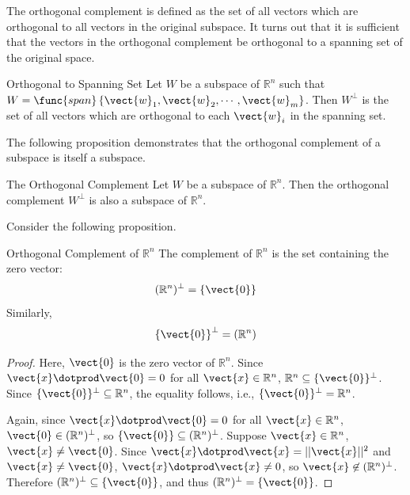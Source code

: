 The orthogonal complement is defined as the set of all vectors which are orthogonal to all vectors in the original subspace. It turns out that it is sufficient that the vectors in the orthogonal complement be orthogonal to a spanning set of the original space.

\begin{proposition}{Orthogonal to Spanning Set}\label{prop:orthogonalspanningset}
Let $W$ be a subspace of $\mathbb{R}^n$ such that $W = \func{span} \left\{ \vect{w}_1, \vect{w}_2, \cdots, \vect{w}_m \right\}$. Then $W^{\perp}$ is the set of all vectors which are orthogonal to each $\vect{w}_i$ in the spanning set. 
\end{proposition}

The following proposition demonstrates that the orthogonal complement of a subspace is itself a subspace. 

\begin{proposition}{The Orthogonal Complement}\label{prop:subspacecomplement}
Let $W$ be a subspace of $\mathbb{R}^n$. Then the orthogonal complement $W^{\perp}$ is also a subspace of $\mathbb{R}^n$.
\end{proposition}

Consider the following proposition.

\begin{proposition}{Orthogonal Complement of $\mathbb{R}^n$}\label{prop:complementofrn}
The complement of $\mathbb{R}^n$ is the set containing the zero vector:
\[
 (\mathbb{R}^n)^{\perp} = \left\{ \vect{0} \right\}
\]
Similarly, 
\[
\left\{ \vect{0} \right\}^{\perp} = (\mathbb{R}^n)
\]
\end{proposition}

\begin{proof}
Here, $\vect{0}$ is the zero vector of $\mathbb{R}^n$.
Since $\vect{x}\dotprod\vect{0}=0$ for all $\vect{x}\in\mathbb{R}^n$, 
$\mathbb{R}^n\subseteq\{ \vect{0}\}^{\perp}$.
Since $\{ \vect{0}\}^{\perp}\subseteq\mathbb{R}^n$, the equality follows,
i.e., $\{ \vect{0}\}^{\perp}=\mathbb{R}^n$.

Again, since $\vect{x}\dotprod\vect{0}=0$ for all $\vect{x}\in\mathbb{R}^n$,
$\vect{0}\in (\mathbb{R}^n)^{\perp}$, so $\{ \vect{0}\}\subseteq(\mathbb{R}^n)^{\perp}$.
Suppose $\vect{x}\in\mathbb{R}^n$, $\vect{x}\neq\vect{0}$.  
Since $\vect{x}\dotprod\vect{x}=||\vect{x}||^2$ and $\vect{x}\neq\vect{0}$,
$\vect{x}\dotprod\vect{x}\neq 0$, so $\vect{x}\not\in(\mathbb{R}^n)^{\perp}$.
Therefore $(\mathbb{R}^n)^{\perp}\subseteq \{\vect{0}\}$, and thus
$(\mathbb{R}^n)^{\perp}=\{\vect{0}\}$.
\end{proof}

